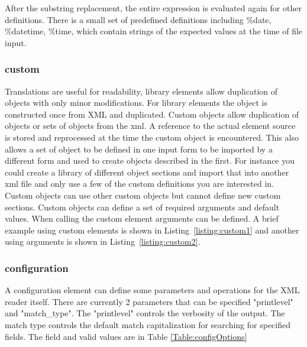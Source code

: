 \documentclass[12pt]{article} %
\begin{document}
 After the substring replacement, the entire expression is evaluated again for other definitions.  There is a small set of predefined definitions including \%date, \%datetime, \%time, which contain strings of the expected values at the time of file input.  
 
 \subsubsection{custom}
 Translations are useful for readability, library elements allow duplication of objects with only minor modifications.  For library elements the object is constructed once from XML and duplicated.  Custom objects allow duplication of objects or sets of objects from the xml.  A reference to the actual element source is stored and reprocessed at the time the custom object is encountered. This also allows a set of object to be defined in one input form to be imported by a different form and used to create objects described in the first.  For instance you could create a library of different object sections and import that into another xml file and only use a few of the custom definitions you are interested in.  Custom objects can use other custom objects but cannot define new custom sections.   Custom objects can define a set of required arguments and default values.  When calling the custom element arguments can be defined. 
  A brief example using custom elements is shown in Listing~\ref{listing:custom1} and another using arguments is shown in Listing~\ref{listing:custom2}.
 
 
 
 \subsubsection{configuration}
 A configuration element can define some parameters and operations for the XML reader itself.  There are currently 2 parameters that can be specified "printlevel" and "match\_type".  The "printlevel" controls the verbosity of the output.  The match type controls the default match capitalization for searching for specified fields.  The field and valid values are in Table \ref{Table:configOptions}
\end{document}
